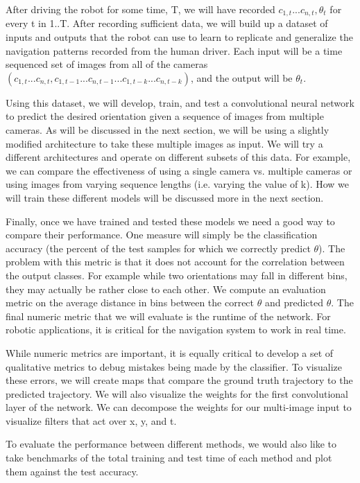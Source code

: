 \documentclass[12pt]{article}
\begin{document}
After driving the robot for some time, T, we will have recorded $c_{1,t}...c_{n,t}, \theta_t$ for every t in 1..T. After recording sufficient data, we will build up a dataset of inputs and outputs that the robot can use to learn to replicate and generalize the navigation patterns recorded from the human driver. Each input will be a time sequenced set of images from all of the cameras $(c_{1,t}...c_{n,t}, c_{1,t-1}...c_{n,t-1}...c_{1,t-k}...c_{n,t-k})$, and the output will be $\theta_t$.

Using this dataset, we will develop, train, and test a convolutional neural network to predict the desired orientation given a sequence of images from multiple cameras. As will be discussed in the next section, we will be using a slightly modified architecture to take these multiple images as input. We will try a different architectures and operate on different subsets of this data. For example, we can compare the effectiveness of using a single camera vs. multiple cameras or using images from varying sequence lengths (i.e. varying the value of k). How we will train these different models will be discussed more in the next section.

Finally, once we have trained and tested these models we need a good way to compare their performance. One measure will simply be the classification accuracy (the percent of the test samples for which we correctly predict $\theta$). The problem with this metric is that it does not account for the correlation between the output classes. For example while two orientations may fall in different bins, they may actually be rather close to each other. We compute an evaluation metric on the average distance in bins between the correct $\theta$ and predicted $\theta$. The final numeric metric that we will evaluate is the runtime of the network. For robotic applications, it is critical for the navigation system to work in real time.

While numeric metrics are important, it is equally critical to develop a set of qualitative metrics to debug mistakes being made by the classifier. To visualize these errors, we will create maps that compare the ground truth trajectory to the predicted trajectory. We will also visualize the weights for the first convolutional layer of the network. We can decompose the weights for our multi-image input to visualize filters that act over x, y, and t.

To evaluate the performance between different methods, we would also like to take benchmarks of the total training and test time of each method and plot them against the test accuracy.
\end{document}
